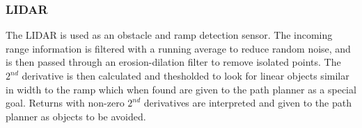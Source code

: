 \subsubsection{LIDAR}

The LIDAR is used as an obstacle and ramp detection sensor. The incoming range information is filtered with a running average to reduce random noise, and is then passed through an erosion-dilation filter to remove isolated points. The $2^{nd}$ derivative is then calculated and thesholded to look for linear objects similar in width to the ramp which when found are given to the path planner as a special goal. Returns with non-zero $2^{nd}$ derivatives are interpreted and given to the path planner as objects to be avoided.
